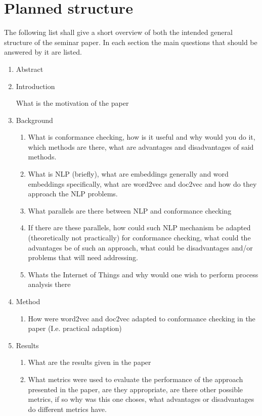 \documentclass[runningheads]{template/llncs}
\begin{document}
\section{Planned structure}
The following list shall give a short overview of both the intended general structure of the seminar paper. In each section the main questions that should be answered by it are listed.
\begin{enumerate}
	\item Abstract
	\item Introduction
	\begin{enumerate}
		What is the motivation of the paper
	\end{enumerate}
	\item Background
	\begin{enumerate}
		\item What is conformance checking, how is it useful and why would you do it, which methods are there, what are advantages and disadvantages of said methods.
		\item What is NLP (briefly), what are embeddings generally and word embeddings specifically, what are word2vec and doc2vec and how do they approach the NLP problems.
		\item What parallels are there between NLP and conformance checking
		\item If there are these parallels, how could such NLP mechanism be adapted (theoretically not practically) for conformance checking, what could the advantages be of such an approach, what could be disadvantages and/or problems that will need addressing.
		\item Whats the Internet of Things and why would one wish to perform process analysis there
	\end{enumerate}
	\item Method
	\begin{enumerate}
		\item How were word2vec and doc2vec adapted to conformance checking in the paper (I.e. practical adaption)
	\end{enumerate}
	\item Results
	\begin{enumerate}
		\item What are the results given in the paper
		\item What metrics were used to evaluate the performance of the approach presented in the paper, are they appropriate, are there other possible metrics, if so why was this one choses, what advantages or disadvantages do different metrics have.

\end{enumerate}
\end{enumerate}
\end{document}
